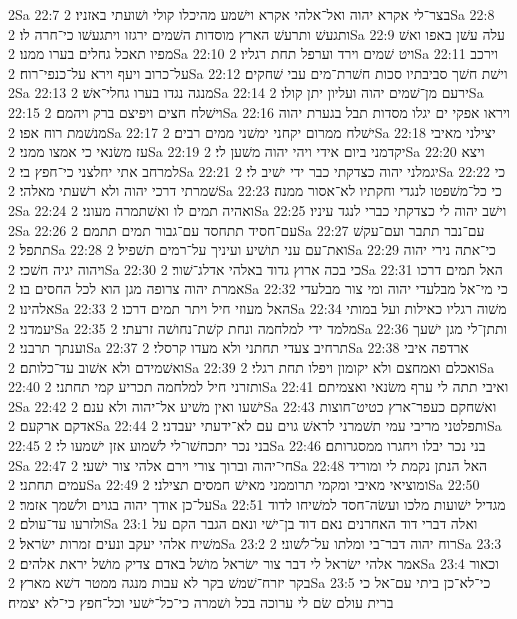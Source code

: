 2Sa 22:7  בצר־לי אקרא יהוה ואל־אלהי אקרא וישׁמע מהיכלו קולי ושׁועתי באזניו׃
2Sa 22:8  ותגעשׁ ותרעשׁ הארץ מוסדות השׁמים ירגזו ויתגעשׁו כי־חרה לו׃
2Sa 22:9  עלה עשׁן באפו ואשׁ מפיו תאכל גחלים בערו ממנו׃
2Sa 22:10  ויט שׁמים וירד וערפל תחת רגליו׃
2Sa 22:11  וירכב על־כרוב ויעף וירא על־כנפי־רוח׃
2Sa 22:12  וישׁת חשׁך סביבתיו סכות חשׁרת־מים עבי שׁחקים׃
2Sa 22:13  מנגה נגדו בערו גחלי־אשׁ׃
2Sa 22:14  ירעם מן־שׁמים יהוה ועליון יתן קולו׃
2Sa 22:15  וישׁלח חצים ויפיצם ברק ויהמם׃
2Sa 22:16  ויראו אפקי ים יגלו מסדות תבל בגערת יהוה מנשׁמת רוח אפו׃
2Sa 22:17  ישׁלח ממרום יקחני ימשׁני ממים רבים׃
2Sa 22:18  יצילני מאיבי עז משׂנאי כי אמצו ממני׃
2Sa 22:19  יקדמני ביום אידי ויהי יהוה משׁען לי׃
2Sa 22:20  ויצא למרחב אתי יחלצני כי־חפץ בי׃
2Sa 22:21  יגמלני יהוה כצדקתי כבר ידי ישׁיב לי׃
2Sa 22:22  כי שׁמרתי דרכי יהוה ולא רשׁעתי מאלהי׃
2Sa 22:23  כי כל־משׁפטו לנגדי וחקתיו לא־אסור ממנה׃
2Sa 22:24  ואהיה תמים לו ואשׁתמרה מעוני׃
2Sa 22:25  וישׁב יהוה לי כצדקתי כברי לנגד עיניו׃
2Sa 22:26  עם־חסיד תתחסד עם־גבור תמים תתמם׃
2Sa 22:27  עם־נבר תתבר ועם־עקשׁ תתפל׃
2Sa 22:28  ואת־עם עני תושׁיע ועיניך על־רמים תשׁפיל׃
2Sa 22:29  כי־אתה נירי יהוה ויהוה יגיה חשׁכי׃
2Sa 22:30  כי בכה ארוץ גדוד באלהי אדלג־שׁור׃
2Sa 22:31  האל תמים דרכו אמרת יהוה צרופה מגן הוא לכל החסים בו׃
2Sa 22:32  כי מי־אל מבלעדי יהוה ומי צור מבלעדי אלהינו׃
2Sa 22:33  האל מעוזי חיל ויתר תמים דרכו׃
2Sa 22:34  משׁוה רגליו כאילות ועל במותי יעמדני׃
2Sa 22:35  מלמד ידי למלחמה ונחת קשׁת־נחושׁה זרעתי׃
2Sa 22:36  ותתן־לי מגן ישׁעך וענתך תרבני׃
2Sa 22:37  תרחיב צעדי תחתני ולא מעדו קרסלי׃
2Sa 22:38  ארדפה איבי ואשׁמידם ולא אשׁוב עד־כלותם׃
2Sa 22:39  ואכלם ואמחצם ולא יקומון ויפלו תחת רגלי׃
2Sa 22:40  ותזרני חיל למלחמה תכריע קמי תחתני׃
2Sa 22:41  ואיבי תתה לי ערף משׂנאי ואצמיתם׃
2Sa 22:42  ישׁעו ואין משׁיע אל־יהוה ולא ענם׃
2Sa 22:43  ואשׁחקם כעפר־ארץ כטיט־חוצות אדקם ארקעם׃
2Sa 22:44  ותפלטני מריבי עמי תשׁמרני לראשׁ גוים עם לא־ידעתי יעבדני׃
2Sa 22:45  בני נכר יתכחשׁו־לי לשׁמוע אזן ישׁמעו לי׃
2Sa 22:46  בני נכר יבלו ויחגרו ממסגרותם׃
2Sa 22:47  חי־יהוה וברוך צורי וירם אלהי צור ישׁעי׃
2Sa 22:48  האל הנתן נקמת לי ומוריד עמים תחתני׃
2Sa 22:49  ומוציאי מאיבי ומקמי תרוממני מאישׁ חמסים תצילני׃
2Sa 22:50  על־כן אודך יהוה בגוים ולשׁמך אזמר׃
2Sa 22:51  מגדיל ישׁועות מלכו ועשׂה־חסד למשׁיחו לדוד ולזרעו עד־עולם׃
2Sa 23:1  ואלה דברי דוד האחרנים נאם דוד בן־ישׁי ונאם הגבר הקם על משׁיח אלהי יעקב ונעים זמרות ישׂראל׃
2Sa 23:2  רוח יהוה דבר־בי ומלתו על־לשׁוני׃
2Sa 23:3  אמר אלהי ישׂראל לי דבר צור ישׂראל מושׁל באדם צדיק מושׁל יראת אלהים׃
2Sa 23:4  וכאור בקר יזרח־שׁמשׁ בקר לא עבות מנגה ממטר דשׁא מארץ׃
2Sa 23:5  כי־לא־כן ביתי עם־אל כי ברית עולם שׂם לי ערוכה בכל ושׁמרה כי־כל־ישׁעי וכל־חפץ כי־לא יצמיח׃
